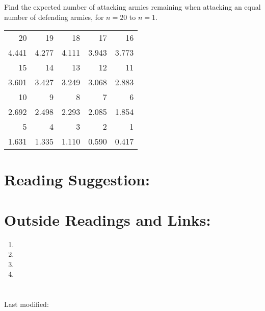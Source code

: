 \documentclass[12pt]{article}
\begin{document}
\begin{exercise}
    Find the expected number of attacking armies remaining when
    attacking an equal number of defending armies, for \( n = 20 \) to \(
    n = 1 \).
\end{exercise}
\begin{solution}

    \begin{tabular}{rrrrr}
        20     & 19       & 18          & 17           & 16          \\ 
        4.441  & 4.277    & 4.111       & 3.943        & 3.773       \\ 
        15     & 14       & 13          & 12           & 11          \\ 
        3.601  & 3.427    & 3.249       & 3.068        & 2.883       \\ 
        10     & 9        & 8           & 7            & 6           \\ 
        2.692  & 2.498    & 2.293       & 2.085        & 1.854       \\ 
        5      & 4        & 3           & 2            & 1           \\ 
        1.631  & 1.335    & 1.110       & 0.590        & 0.417
    \end{tabular}
\end{solution}

\hr

\section*{Reading Suggestion:}




\hr

\section*{Outside Readings and Links:}
\begin{enumerate}
    \item
    \item
    \item
    \item
\end{enumerate}

\section*{\solutionsname} \loadSolutions

\hr

\mydisclaim \myfooter

Last modified:  \flastmod
\end{document}
